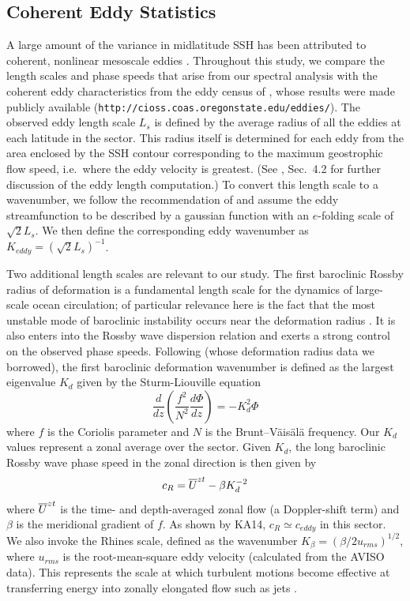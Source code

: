 \documentclass[10pt]{article}
\newcommand{\od}[2]{\ensuremath{\frac{d #1}{d #2}}}
\newcommand{\ol}{\ensuremath{\overline}}
\begin{document}
\subsection{Coherent Eddy Statistics}

A large amount of the variance in midlatitude SSH has been attributed to coherent, nonlinear mesoscale eddies \citep{CheltonEtAl2011}. Throughout this study, we compare the length scales and phase speeds that arise from our spectral analysis with the coherent eddy characteristics from the eddy census of \citet{CheltonEtAl2011}, whose results were made publicly available ({\tt http://cioss.coas.oregonstate.edu/eddies/}). The observed eddy length scale $L_s$ is defined by the average radius of all the eddies at each latitude in the sector. This radius itself is determined for each eddy from the area enclosed by the SSH contour corresponding to the maximum geostrophic flow speed, i.e.~where the eddy velocity is greatest. (See \citealt{CheltonEtAl2011}, Sec.~4.2 for further discussion of the eddy length computation.) To convert this length scale to a wavenumber, we follow the recommendation of \citet{CheltonEtAl2011} and assume the eddy streamfunction to be described by a gaussian function with an $e$-folding scale of $\sqrt{2} L_s$. We then define the corresponding eddy wavenumber as $K_{eddy} = (\sqrt{2} L_s)^{-1}$.

Two additional length scales are relevant to our study. The first baroclinic Rossby radius of deformation is a fundamental length scale for the dynamics of large-scale ocean circulation; of particular relevance here is the fact that the most unstable mode of baroclinic instability occurs near the deformation radius \citep{Stammer1997,CheltonEtAl1998,Smith2007}. It is also enters into the Rossby wave dispersion relation and exerts a strong control on the observed phase speeds. Following \citet{TullochEtAl2009} (whose deformation radius data we borrowed), the first baroclinic deformation wavenumber is defined as the largest eigenvalue $K_d$ given by the Sturm-Liouville equation
\begin{equation}
\od{}{z}\left (\frac{f^2}{N^2} \od{\Phi}{z} \right ) = - K_d^2 \Phi
\end{equation}
where $f$ is the Coriolis parameter and $N$ is the Brunt--V{\"a}is{\"a}l{\"a} frequency. Our $K_d$ values represent a zonal average over the sector. Given $K_d$, the long baroclinic Rossby wave phase speed in the zonal direction is then given by
\begin{equation}
c_R = \ol{U}^{zt}  - \beta K_d^{-2}
\label{eq:c_R}
\end{equation}
where $\ol{U}^{zt}$ is the time- and depth-averaged zonal flow (a Doppler-shift term) and $\beta$ is the meridional gradient of $f$. As shown by KA14, $c_R \simeq c_{eddy}$ in this sector. We also invoke the Rhines scale, defined as the wavenumber $K_\beta = (\beta / 2 u_{rms} )^{1/2}$, where $u_{rms}$ is the root-mean-square eddy velocity (calculated from the AVISO data). This represents the scale at which turbulent motions become effective at transferring energy into zonally elongated flow such as jets \citep{Rhines1975,MaltrudVallis1991}.
\end{document}
